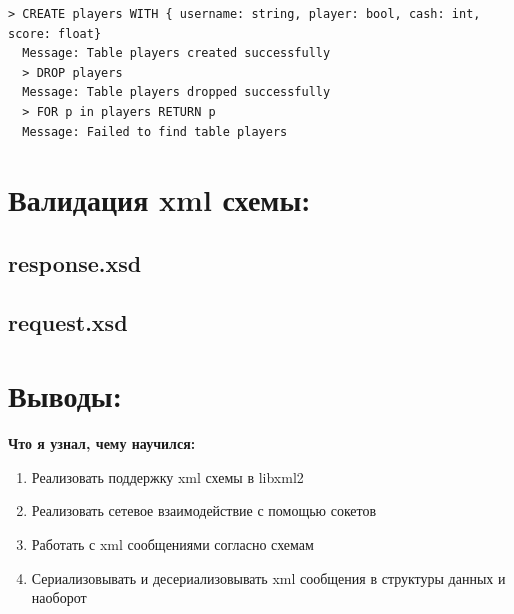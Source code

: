 \documentclass[12pt,onecolumn]{article}
\begin{document}
\begin{lstlisting}[style=bash]
  > CREATE players WITH { username: string, player: bool, cash: int, score: float}                                                             
  Message: Table players created successfully                                                                                                  
  > DROP players                                                                                                                               
  Message: Table players dropped successfully                                                                                                  
  > FOR p in players RETURN p                                                                                                                  
  Message: Failed to find table players  
\end{lstlisting}


\section{Валидация xml схемы:}
\subsection{response.xsd}


\subsection{request.xsd}


\section{Выводы:}

\textbf{Что я узнал, чему научился:}
\begin{enumerate}
    \item Реализовать поддержку xml схемы в libxml2
    \item Реализовать сетевое взаимодействие с помощью сокетов
    \item Работать с xml сообщениями согласно схемам
    \item Сериализовывать и десериализовывать xml сообщения в структуры данных и наоборот
\end{enumerate}
\end{document}
